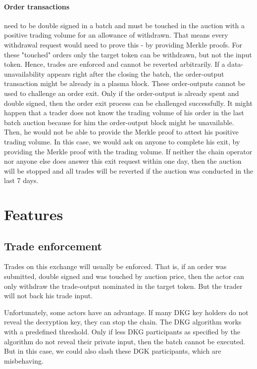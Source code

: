 \documentclass[11pt,parskip=full]{scrartcl}%
\begin{document}
\paragraph{Order transactions} need to be double signed in a batch and must be touched in the auction with a positive trading volume for an allowance of withdrawn.
That means every withdrawal request would need to prove this - by providing Merkle proofs.
For these  "touched" orders only the target token can be withdrawn, but not the input token.
Hence, trades are enforced and cannot be reverted arbitrarily.
If a data-unavailability appears right after the closing the batch, the order-output transaction might be already in a plasma block.
These order-outputs cannot be used to challenge an order exit.
Only if the order-output is already spent and double signed, then the order exit process can be challenged successfully.
It might happen that a trader does not know the trading volume of his order in the last batch auction because for him the order-output block might be unavailable.
Then, he would not be able to provide the Merkle proof to attest his positive trading volume.
In this case, we would ask on anyone to complete his exit, by providing the Merkle proof with the trading volume.
If neither the chain operator nor anyone else does answer this exit request within one day, then the auction will be stopped and all trades will be reverted if the auction was conducted in the last 7 days.


\newpage

\section{Features}

\subsection{Trade enforcement}
Trades on this exchange will usually be enforced.
That is, if an order was submitted, double signed and was touched by auction price, then the actor can only withdraw the trade-output nominated in the target token.
But the trader will not back his trade input.

Unfortunately, some actors have an advantage.
If many DKG key holders do not reveal the decryption key, they can stop the chain.
The DKG algorithm works with a predefined threshold.
Only if less DKG participants as specified by the algorithm do not reveal their private input, then the batch cannot be executed.
But in this case, we could also slash these DGK participants, which are misbehaving.
\end{document}
